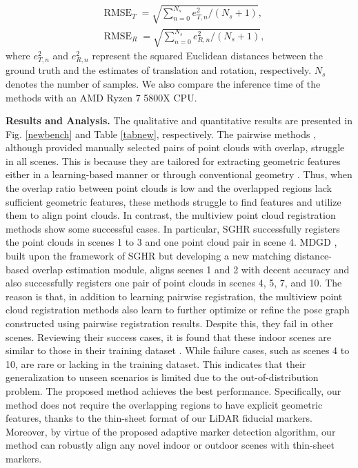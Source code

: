 \begin{equation}
\begin{aligned}
&\operatorname{RMSE}_{T}=\sqrt{\sum_{n=0}^{N_s} e_{T, n}^2 /(N_s+1)}, 
\\
& \operatorname{RMSE}_{R}=\sqrt{\sum_{n=0}^{N_s} e_{R, n}^2 /(N_s+1)},
\end{aligned} \label{rmse}
\end{equation}
where $e_{T, n}^2$ and $e_{R, n}^2$ represent the squared Euclidean distances between the ground truth and the estimates of translation and rotation, respectively. $N_s$ denotes the number of samples. We also compare the inference time of the methods with an AMD Ryzen 7 5800X CPU.
\par
\noindent\textbf{Results and Analysis.}
The qualitative and quantitative results are presented in Fig. \ref{newbench} and Table \ref{tabnew}, respectively. 
The pairwise methods \cite{se3et,geotransformer,teaser}, although provided manually selected pairs of point clouds with overlap, struggle in all scenes.
%
This is because they are tailored for extracting geometric features either in a learning-based manner \cite{se3et,geotransformer} or through conventional geometry \cite{teaser}. Thus, when the overlap ratio between point clouds is low and the overlapped regions lack sufficient geometric features, these methods struggle to find features and utilize them to align point clouds. 
%
In contrast, the multiview point cloud registration methods \cite{mdgd,sghr} show some successful cases. In particular, SGHR \cite{sghr} successfully registers the point clouds in scenes 1 to 3 and one point cloud pair in scene 4. MDGD \cite{mdgd}, built upon the framework of SGHR \cite{sghr} but developing a new matching distance-based overlap estimation module, aligns scenes 1 and 2 with decent accuracy and also successfully registers one pair of point clouds in scenes 4, 5, 7, and 10. The reason is that, in addition to learning pairwise registration, the multiview point cloud registration methods \cite{mdgd,sghr} also learn to further optimize or refine the pose graph constructed using pairwise registration results.
%
Despite this, they fail in other scenes. Reviewing their success cases, it is found that these indoor scenes are similar to those in their training dataset \cite{3dmatch}. While failure cases, such as scenes 4 to 10, are rare or lacking in the training dataset. This indicates that their generalization to unseen scenarios is limited due to the out-of-distribution problem. The proposed method achieves the best performance. Specifically, our method does not require the overlapping regions to have explicit geometric features, thanks to the thin-sheet format of our LiDAR fiducial markers. Moreover, by virtue of the proposed adaptive marker detection algorithm, our method can robustly align any novel indoor or outdoor scenes with thin-sheet markers.
